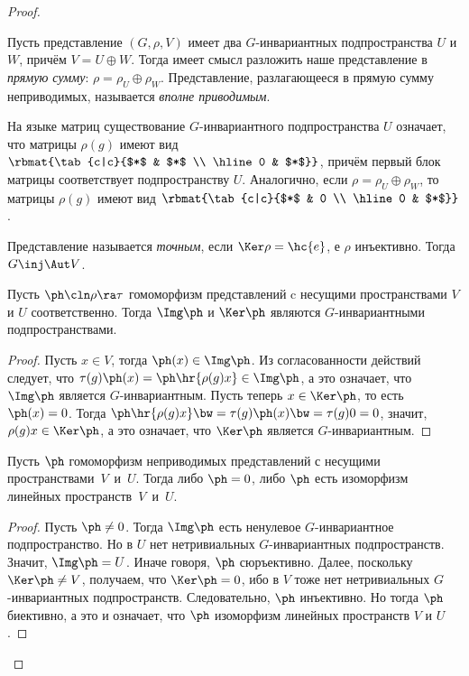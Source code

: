 \documentclass[a4paper]{article}
\newcommand{\kph}{\Ker \ph}
\begin{document}
\begin{proof}
\begin{df}
Пусть представление $(G, \rho, V)$ имеет два $G$-инвариантных подпространства $U$  и $W$, причём $V = U
\oplus W$. Тогда имеет смысл разложить наше представление в \emph{прямую сумму}: $\rho = \rho_U \oplus
\rho_W$. Представление, разлагающееся в прямую сумму неприводимых, называется \emph{вполне приводимым}.
\end{df}

На языке матриц существование $G$-инвариантного подпространства $U$ означает, что  матрицы $\rho(g)$ имеют
вид $\rbmat{\tab{c|c}{$*$ & $*$ \\ \hline 0 & $*$}}$, причём первый блок матрицы соответствует
подпространству $U$. Аналогично, если $\rho = \rho_U \oplus \rho_W$, то матрицы $\rho(g)$ имеют вид
$\rbmat{\tab{c|c}{$*$ & 0 \\ \hline 0 & $*$}}$.

\begin{df}
Представление называется \emph{точным}, если $\Ker \rho = \hc{e}$, е $\rho$  инъективно. Тогда $G \inj
\Aut V$.
\end{df}

\begin{theorem}
Пусть $\ph\cln \rho \ra \tau$ гомоморфизм представлений c несущими пространствами  $V$ и $U$ соответственно.
Тогда $\Img \ph$ и $\kph$ являются $G$-инвариантными подпространствами.
\end{theorem}
\begin{proof}
Пусть $x \in V$, тогда $\ph(x) \in \Img \ph$. Из согласованности действий следует,  что
$\tau(g)\ph(x)=\ph\hr{\rho(g)x} \in \Img \ph$, а это означает, что $\Img \ph$ является $G$-инвариантным.
Пусть теперь $x\in \kph$, то есть $\ph(x) = 0$. Тогда $\ph\hr{\rho(g)x}\bw=\tau(g)\ph(x)\bw=\tau(g)0=0$, значит,
$\rho(g)x \in \kph$, а это означает, что $\kph$ является $G$-инвариантным.
\end{proof}

\begin{theorem}
Пусть $\ph$ гомоморфизм неприводимых представлений с несущими пространствами~$V$~и~$U$.
Тогда либо $\ph = 0$, либо $\ph$ есть изоморфизм линейных пространств~$V$~и~$U$.
\end{theorem}
\begin{proof}
Пусть $\ph \neq 0$. Тогда $\Img \ph$ есть ненулевое $G$-инвариантное подпространство.  Но в $U$ нет
нетривиальных $G$-инвариантных подпространств. Значит, $\Img \ph = U$. Иначе говоря, $\ph$ сюръективно.
Далее, поскольку $\kph \neq V$, получаем, что $\kph = 0$, ибо в $V$ тоже нет нетривиальных $G$-инвариантных
подпространств. Следовательно, $\ph$ инъективно. Но тогда $\ph$ биективно, а это и означает, что $\ph$
изоморфизм линейных пространств $V$ и $U$.
\end{proof}


\end{proof}
\end{document}
